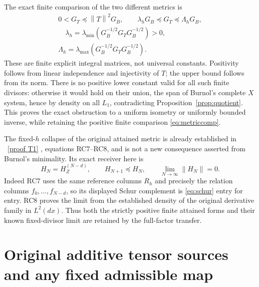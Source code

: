 \documentclass[11pt]{article}
\newcommand{\norm}[1]{\left\lVert#1\right\rVert}
\begin{document}
The exact finite comparison of the two different metrics is
\begin{equation}\label{eq:metriccomp}
 \begin{gathered}
 0<G_T\preceq\norm T^2G_B,
 \qquad \lambda_hG_B\preceq G_T\preceq\Lambda_hG_B,\\
 \quad \lambda_h=\lambda_{\min}(G_B^{-1/2}G_TG_B^{-1/2})>0,
 \\
 \Lambda_h=\lambda_{\max}(G_B^{-1/2}G_TG_B^{-1/2}).
 \end{gathered}
\end{equation}
These are finite explicit integral matrices, not universal
constants. Positivity follows from linear independence and
injectivity of $T$; the upper bound follows from its norm.
There is no positive lower constant valid for all such finite
divisors: otherwise it would hold on their union, the span
of Burnol's complete $X$ system, hence by density on all
$L_1$, contradicting Proposition~\ref{prop:quotient}.
This proves the exact obstruction to a uniform isometry or
uniformly bounded inverse, while retaining the positive
finite comparison \eqref{eq:metriccomp}.

The fixed-$h$ collapse of the original attained metric is
already established in \cite{OriginalTheta}%
~\href{https://github.com/KokunoYumeto/zeta-function-research-reader/blob/5992ad50c0f2a06921f1fcaded7b4e38097c0739/workbenches/splitzero-tandem/continuations/20260920-original-kernel-mixed-determinants/providers/EXACT_CORPUS_RECEIVERS.tex\#L334}{[proof T1]}%
{}, equations
RC7--RC8, and is not a new consequence asserted from Burnol's
minimality. Its exact receiver here is
\[
 H_N=H_Z^{(N-d)},\qquad
 H_{N+1}\preceq H_N,\qquad
 \lim_{N\to\infty}\norm{H_N}=0.
\]
Indeed RC7 uses the same reference columns $R_h$ and precisely
the relation columns $f_0,\ldots,f_{N-d}$, so its displayed
Schur complement is \eqref{eq:schur} entry for entry.
RC8 proves the limit from the established density of the
original derivative family in $L^2(dx)$. Thus both the
strictly positive finite attained forms and their known
fixed-divisor limit are retained by the full-factor transfer.

\section{Original additive tensor sources and any fixed admissible map}
\end{document}
